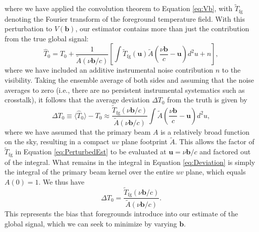 \documentclass[twolcolumn,apj,iop,numberedappendix]{emulateapj}
\begin{document}
where we have applied the convolution theorem to Equation \eqref{eq:Vb}, with $\widetilde{T}_\textrm{fg}$ denoting the Fourier transform of the foreground temperature field.  With this perturbation to $V(\mathbf{b})$, our estimator contains more than just the contribution from the true global signal:
\begin{equation}
\label{eq:PerturbedEst}
\widehat{T}_0 = T_0 + \frac{1}{\widetilde{A} \left( \nu \mathbf{b} / c \right)} \left[ \int  \widetilde{T}_\textrm{fg} (\mathbf{u}) \widetilde{A} \left( \frac{\nu \mathbf{b}}{c} - \mathbf{u} \right) d^2 u + n \right],
\end{equation}
where we have included an additive instrumental noise contribution $n$ to the visibility.  Taking the ensemble average of both sides and assuming that the noise averages to zero (i.e., there are no persistent instrumental systematics such as crosstalk), it follows that the average deviation $\Delta T_0$ from the truth is given by
\begin{equation}
\label{eq:Deviation}
\Delta T_0 \equiv \langle \widehat{T}_0 \rangle - T_0 \approx \frac{\widetilde{T}_\textrm{fg} (\nu \mathbf{b} / c)}{\widetilde{A} \left( \nu \mathbf{b} / c \right)} \int   \widetilde{A} \left( \frac{\nu \mathbf{b}}{c} - \mathbf{u} \right) d^2 u,
\end{equation}
where we have assumed that the primary beam $A$ is a relatively broad function on the sky, resulting in a compact $uv$ plane footprint $\widetilde{A}$.  This allows the factor of $\widetilde{T}_\textrm{fg}$ in Equation \eqref{eq:PerturbedEst} to be evaluated at $\mathbf{u} = \nu \mathbf{b} / c$ and factored out of the integral. What remains in the integral in Equation \eqref{eq:Deviation} is simply the integral of the primary beam kernel over the entire $uv$ plane, which equals $A(0) = 1$. We thus have
\begin{equation}
\Delta T_0 = \frac{\widetilde{T}_\textrm{fg} (\nu \mathbf{b} / c)}{\widetilde{A} \left( \nu \mathbf{b} / c \right)}.
\end{equation}
This represents the bias that foregrounds introduce into our estimate of the global signal, which we can seek to minimize by varying $\mathbf{b}$.
\end{document}
